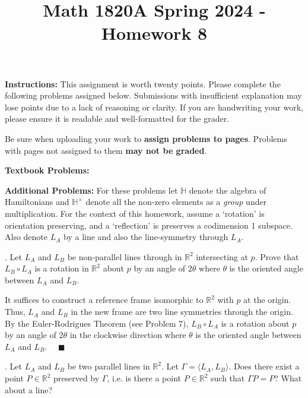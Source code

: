 \documentclass[12pt]{article}
\title{Math 1820A Spring 2024 - Homework 8}
\date{}
\newcommand{\R}{\mathbb{R}}
\newcommand{\Ha}{\mathbb{H}}
\newcommand{\qed}{\quad \blacksquare}
\begin{document}
\maketitle
\vspace{-0.5in}
\begin{spacing}{1.5}
\noindent \textbf{Instructions:}  This assignment is worth twenty points.  Please complete the following problems assigned below.  Submissions with insufficient explanation may lose points due to a lack of reasoning or clarity.  If you are handwriting your work, please ensure it is readable and well-formatted for the grader.

Be sure when uploading your work to \textbf{assign problems to pages}.  Problems with pages not assigned to them \textbf{may not be graded}.  
\end{spacing}




\vspace{10mm}\noindent
\textbf{Textbook Problems: }  

\noindent
\textbf{Additional Problems:}   For these problems let $\Ha$ denote the algebra of Hamiltonians and $\Ha^{\times}$ denote all the non-zero elements as a \emph{group} under multiplication.  For the context of this homework, assume a `rotation' is orientation preserving, and a `reflection' is preserves a codimension 1 subspace. Also denote $L_{A}$ by a line and also the line-symmetry through $L_{A}$.

.  Let $L_{A}$ and $L_{B}$ be non-parallel lines through in $\R^{2}$ intersecting at $p$.  Prove that $L_{B}\circ L_{A}$ is a rotation in $\R^{2}$ about $p$ by an angle of $2\theta$ where $\theta$ is the oriented angle between $L_{A}$ and $L_{B}$.

    \color{blue}
        It suffices to construct a reference frame isomorphic to $\R^2$ with $p$ at the origin. Thus, $L_A$ and $L_B$ in the new frame are two line symmetries through the origin. By the Euler-Rodrigues Theorem (see Problem 7), $L_B \circ L_A$ is a rotation about $p$ by an angle of $2\theta$ in the clockwise direction where $\theta$ is the oriented angle between $L_A$ and $L_B$. $\qed$
    \color{black}


.  Let $L_{A}$ and $L_{B}$ be two parallel lines in $\R^{2}$.  Let $\Gamma = \langle L_{A}, L_{B} \rangle$.  Does there exist a point $P \in \R^{2}$ preserved by $\Gamma$, i.e. is there a point $P \in \R^{2}$ such that $\Gamma P = P$?  What about a line?
\end{document}
